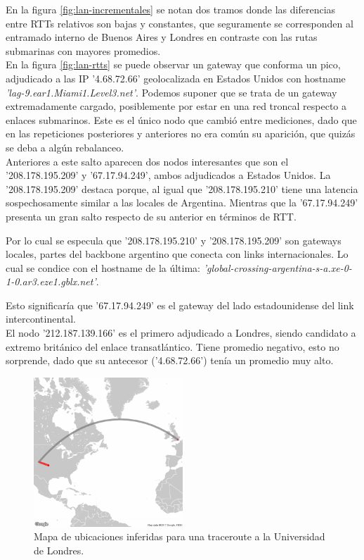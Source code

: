 En la figura \ref{fig:lan-incrementales} se notan dos tramos donde las diferencias entre RTTs relativos son bajas y constantes, que seguramente se corresponden al entramado interno de Buenos Aires y Londres en contraste con las rutas submarinas con mayores promedios.\\


En la figura \ref{fig:lan-rtts} se puede observar un gateway que conforma un pico, adjudicado a las IP '4.68.72.66' geolocalizada en Estados Unidos con hostname \emph{'lag-9.ear1.Miami1.Level3.net'}. Podemos suponer que se trata de un gateway extremadamente cargado, posiblemente por estar en una red troncal respecto a enlaces submarinos. Este es el único nodo que cambió entre mediciones, dado que en las repeticiones posteriores y anteriores no era común su aparición, que quizás se deba a algún rebalanceo. \\


Anteriores a este salto aparecen dos nodos interesantes que son el '208.178.195.209' y '67.17.94.249', ambos adjudicados a Estados Unidos.
La '208.178.195.209' destaca porque, al igual que '208.178.195.210' tiene una latencia sospechosamente similar a las locales de Argentina. Mientras que la '67.17.94.249' presenta un gran salto respecto de su anterior en términos de RTT.

Por lo cual se especula que '208.178.195.210' y '208.178.195.209' son gateways locales, partes del backbone argentino que conecta con links internacionales. Lo cual se condice con el hostname de la última: \emph{'global-crossing-argentina-s-a.xe-0-1-0.ar3.eze1.gblx.net'}.

Esto significaría que '67.17.94.249' es el gateway del lado estadounidense del link intercontinental. \\

El nodo '212.187.139.166' es el primero adjudicado a Londres, siendo candidato a extremo británico del enlace transatlántico. Tiene promedio negativo, esto no sorprende, dado que su antecesor ('4.68.72.66') tenía un promedio muy alto.

\begin{figure}[H]
   \centering
       \includegraphics[width=0.5\textwidth, keepaspectratio]{../img/lan-map}
 \caption{Mapa de ubicaciones inferidas para una traceroute a la Universidad de Londres.}
 \label{fig:lan-map}
\end{figure}

